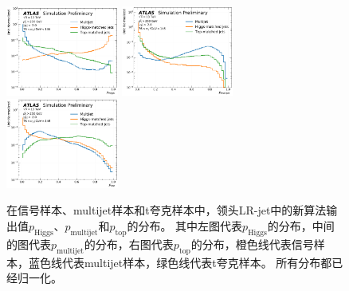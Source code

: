 \begin{figure}[h]
    \includegraphics[width=0.33\textwidth]{figuresXbb/samples/probs_aux/Xbb_Higgs_norm.pdf}
    \includegraphics[width=0.33\textwidth]{figuresXbb/samples/probs_aux/Xbb_QCD_norm.pdf}
    \includegraphics[width=0.33\textwidth]{figuresXbb/samples/probs_aux/Xbb_Top_norm.pdf}
  \caption{在信号样本、multijet样本和t夸克样本中，领头LR-jet中的新算法输出值$p_{\text{Higgs}}$、$p_{\text{multijet}}$和$p_{\text{top}}$的分布。
其中左图代表$p_{\text{Higgs}}$的分布，中间的图代表$p_{\text{multijet}}$的分布，右图代表$p_{\text{top}}$的分布，橙色线代表信号样本，蓝色线代表multijet样本，绿色线代表t夸克样本。
所有分布都已经归一化。}
  \label{fig:DXBBPP}
\end{figure}

